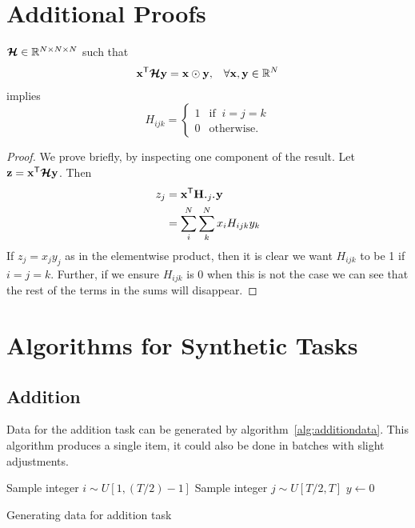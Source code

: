 \chapter{Additional Proofs}
\begin{prop}  \label{prop:identity}
	\(\bm{\mathcal{H}} \in \mathbb{R}^{N \times N \times N}\) such that
\begin{align}
\mathbf{x}^\mathsf{T}\bm{\mathcal{H}}\mathbf{y} = \mathbf{x} \odot \mathbf{y}, 
&&\forall \mathbf{x},\mathbf{y} \in \mathbb{R}^{N}
\end{align} implies
\begin{equation}
	H_{ijk} = \begin{cases}
		1 & \text{if}\;\;i = j = k \\
		0 & \text{otherwise.}
	\end{cases}
\end{equation}

\end{prop}
\begin{proof}
We prove briefly, by inspecting one component of the result. Let 
\(\mathbf{z} = \mathbf{x}^\mathsf{T}\bm{\mathcal{H}}\mathbf{y}\). Then
\begin{align}
	z_j &= \vec{x}^\mathsf{T}\mat{H}_{\midbullet j \midbullet}\vec{y} \\
		&= \sum_i^N\sum_k^N x_iH_{ijk}y_k
\end{align}
If \(z_j = x_jy_j\) as in the elementwise product, then it is clear we want \(H_{ijk}\) to be 
1 if \(i=j=k\). Further, if we ensure \(H_{ijk}\) is 0 when this is not the case we can see that
the rest of the terms in the sums will disappear.
\end{proof}

\chapter{Algorithms for Synthetic Tasks}

\section{Addition}\label{sec:additionpseudo}
Data for the addition task can be generated by algorithm~\ref{alg:additiondata}. This algorithm
produces a single item, it could also be done in batches with slight adjustments.

\begin{algorithm}
	\BlankLine
	Sample integer \(i \sim U[1, (T/2)-1]\)\;
	Sample integer \(j \sim U[T/2, T]\)\;
	\(y \gets 0\)\;
	\caption{Generating data for addition task}
	\label{alg:additiondata}
\end{algorithm}

